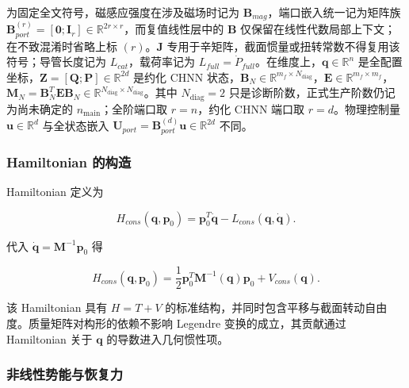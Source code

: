 为固定全文符号，磁感应强度在涉及磁场时记为 \(\mathbf{B}_{mag}\)，端口嵌入统一记为矩阵族 \(\mathbf{B}_{port}^{(r)}=[\mathbf{0};\mathbf{I}_{r}]\in\mathbb{R}^{2r\times r}\)，而复值线性层中的 \(\mathbf{B}\) 仅保留在线性代数局部上下文；在不致混淆时省略上标 \((r)\)。\(\mathbf{J}\) 专用于辛矩阵，截面惯量或扭转常数不得复用该符号；导管长度记为 \(L_{cat}\)，载荷率记为 \(L_{full}=\dot P_{full}\)。在维度上，\(\mathbf{q}\in\mathbb{R}^{n}\) 是全配置坐标，\(\mathbf{Z}=[\mathbf{Q};\mathbf{P}]\in\mathbb{R}^{2d}\) 是约化 CHNN 状态，\(\mathbf{B}_{N}\in\mathbb{R}^{m_f\times N_{\mathrm{diag}}}\)，\(\mathbf{E}\in\mathbb{R}^{m_f\times m_f}\)，\(\mathbf{M}_{N}=\mathbf{B}_{N}^{T}\mathbf{E}\mathbf{B}_{N}\in\mathbb{R}^{N_{\mathrm{diag}}\times N_{\mathrm{diag}}}\)。其中 \(N_{\mathrm{diag}}=2\) 只是诊断阶数，正式生产阶数仍记为尚未确定的 \(n_{\mathrm{main}}\)；全阶端口取 \(r=n\)，约化 CHNN 端口取 \(r=d\)。物理控制量 \(\mathbf{u}\in\mathbb{R}^{d}\) 与全状态嵌入 \(\mathbf{U}_{port}=\mathbf{B}_{port}^{(d)}\mathbf{u}\in\mathbb{R}^{2d}\) 不同。

\subsubsection{Hamiltonian 的构造}\label{sec:hamiltonian-3-2-4}

Hamiltonian 定义为

\begin{equation}
\label{eq:hamiltonian-3-13}
H_{cons}\left( \mathbf{q},\mathbf{p}_{0} \right) = \mathbf{p}_{0}^{T}\dot{\mathbf{q}} - L_{cons}\left( \mathbf{q},\dot{\mathbf{q}} \right).
\end{equation}

代入 \(\dot{\mathbf{q}} = \mathbf{M}^{- 1}\mathbf{p}_{0}\) 得

\begin{equation}
\label{eq:hamiltonian-3-14}
\boxed{H_{cons}\left( \mathbf{q},\mathbf{p}_{0} \right) = \frac{1}{2}\mathbf{p}_{0}^{T}\mathbf{M}^{- 1}\left( \mathbf{q} \right)\mathbf{p}_{0} + V_{cons}\left( \mathbf{q} \right).}
\end{equation}

该 Hamiltonian 具有 \(H = T + V\) 的标准结构，并同时包含平移与截面转动自由度。质量矩阵对构形的依赖不影响 Legendre 变换的成立，其贡献通过 Hamiltonian 关于 \(\mathbf{q}\) 的导数进入几何惯性项。

\subsubsection{非线性势能与恢复力}\label{sec:hamiltonian-3-2-5}

